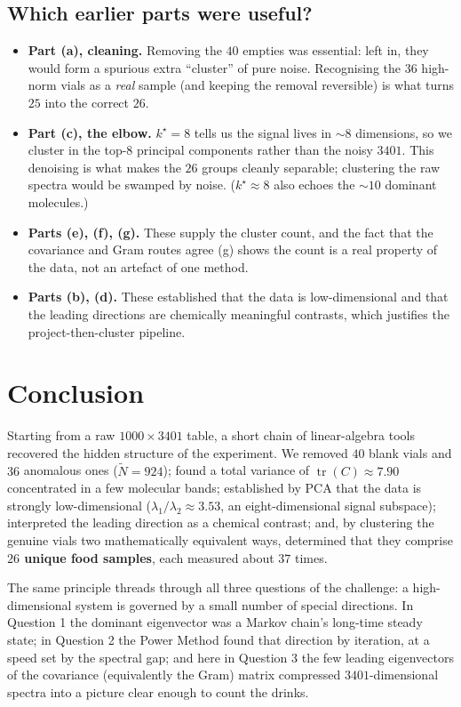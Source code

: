 \documentclass[11pt]{article}
\DeclareMathOperator{\tr}{tr}
\newcommand{\Nt}{\widetilde{N}}
\theoremstyle{definition}\newtheorem{definition}{Definition}[section]
\theoremstyle{plain}\newtheorem{proposition}{Proposition}[section]
\theoremstyle{remark}\newtheorem{remark}{Remark}[section]
\begin{document}
\subsection{Which earlier parts were useful?}
\begin{itemize}
\item \textbf{Part (a), cleaning.} Removing the $40$ empties was essential: left in, they would
form a spurious extra ``cluster'' of pure noise. Recognising the $36$ high-norm vials as a
\emph{real} sample (and keeping the removal reversible) is what turns $25$ into the correct
$26$.
\item \textbf{Part (c), the elbow.} $k^\star=8$ tells us the signal lives in $\sim8$ dimensions,
so we cluster in the top-$8$ principal components rather than the noisy $3401$. This denoising
is what makes the $26$ groups cleanly separable; clustering the raw spectra would be swamped by
noise. ($k^\star\approx8$ also echoes the $\sim10$ dominant molecules.)
\item \textbf{Parts (e), (f), (g).} These supply the cluster count, and the fact that the
covariance and Gram routes agree (g) shows the count is a real property of the data, not an
artefact of one method.
\item \textbf{Parts (b), (d).} These established that the data is low-dimensional and that the
leading directions are chemically meaningful contrasts, which justifies the
project-then-cluster pipeline.
\end{itemize}

\section{Conclusion}\label{sec:conclusion}
Starting from a raw $1000\times3401$ table, a short chain of linear-algebra tools recovered the
hidden structure of the experiment. We removed $40$ blank vials and $36$ anomalous ones
($\Nt=924$); found a total variance of $\tr(C)\approx7.90$ concentrated in a few molecular
bands; established by PCA that the data is strongly low-dimensional
($\lambda_1/\lambda_2\approx3.53$, an eight-dimensional signal subspace); interpreted the
leading direction as a chemical contrast; and, by clustering the genuine vials two
mathematically equivalent ways, determined that they comprise \textbf{$26$ unique food
samples}, each measured about $37$ times.

The same principle threads through all three questions of the challenge: a high-dimensional
system is governed by a small number of special directions. In Question 1 the dominant
eigenvector was a Markov chain's long-time steady state; in Question 2 the Power Method found
that direction by iteration, at a speed set by the spectral gap; and here in Question 3 the few
leading eigenvectors of the covariance (equivalently the Gram) matrix compressed $3401$-dimensional
spectra into a picture clear enough to count the drinks.

\appendix
\end{document}
